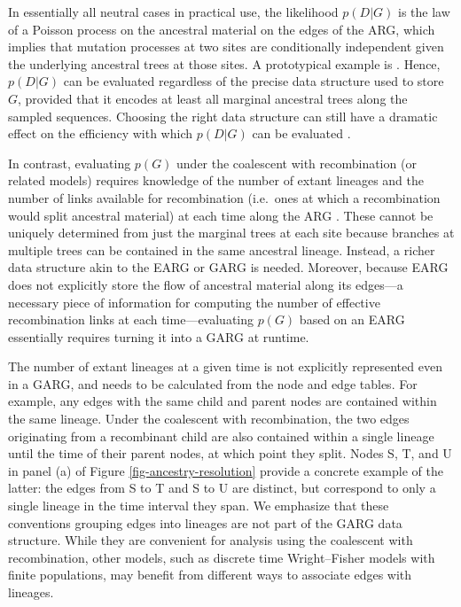 \documentclass{article}
\begin{document}
In essentially all neutral cases in practical use, the likelihood $p(D | G)$ is the law of
a Poisson process on the ancestral material on the edges of the ARG, which implies
that mutation processes at two sites are conditionally independent given the
underlying ancestral trees at those sites. A prototypical example is
\citet[Eq.\ (2)]{mahmoudi2022bayesian}. Hence, $p(D | G)$ can be evaluated
regardless of the precise data structure used to store $G$, provided that it encodes
at least all marginal ancestral trees along the sampled sequences.  Choosing the
right data structure can still have a dramatic effect on the efficiency with which
$p(D | G)$ can be evaluated \citep{mahmoudi2022bayesian}.

In contrast, evaluating $p(G)$ under the coalescent with recombination
(or related models) requires knowledge of the number of extant lineages and
the number of links available for recombination (i.e.\ ones at which a recombination
would split ancestral material) at each time along the ARG
\citep[Eq.\ (3)]{mahmoudi2022bayesian}. These cannot be uniquely determined
from just the marginal trees at each site because branches at multiple trees can be
contained in the same ancestral lineage. Instead, a richer data structure akin to the
EARG or GARG is needed. Moreover, because EARG does not explicitly store the flow
of ancestral material along its edges---a necessary piece of information for
computing the number of effective recombination links at each time---evaluating
$p(G)$ based on an EARG essentially requires turning it into a GARG at runtime.

The number of extant lineages at a given time is not explicitly represented even
in a GARG, and needs to be calculated from the node and edge tables.
For example, any edges with the same child and parent nodes are contained within
the same lineage. Under the coalescent with recombination, the two edges
originating from a recombinant child are also contained within a single lineage
until the time of their parent nodes, at which point they split. Nodes S, T, and U
in panel (a) of Figure \ref{fig-ancestry-resolution} provide a concrete example
of the latter: the edges from S to T and S to U are distinct, but correspond to only
a single lineage in the time interval they span. We emphasize that these
conventions grouping edges into lineages are not part of the GARG data structure.
While they are convenient for analysis using the coalescent with recombination,
other models, such as discrete time Wright--Fisher models with finite populations,
may benefit from different ways to associate edges with lineages.
\end{document}
